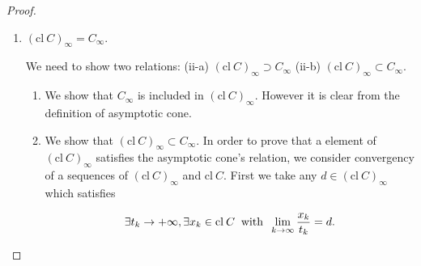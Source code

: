\documentclass[a4paper,11pt]{jsarticle}
\newcommand{\NaturalNumberSet}{\mathbb{N}}
\begin{document}
\begin{proof}
\begin{enumerate}[label=\roman*,align=CenterWithParen]
\begin{enumerate}[label=i-\alph*,align=CenterWithParen]
        By the definition of convergence of a sequence,

        \begin{equation}
          \begin{split}
            \forall \epsilon &> 0, \exists \bar{m} \in \NaturalNumberSet \:s.t.\: \forall m \geq \bar{m}, ||d_m -d|| < \frac{\epsilon}{2}, \text{and} \\
            \forall \epsilon &> 0, \exists \hat{m} \in \NaturalNumberSet \:s.t.\: \forall m \geq \hat{m}, ||\frac{x_m}{t_m} -d_m|| < \frac{\epsilon}{2}. \notag
          \end{split}
        \end{equation}

        Also, we let $\tilde{m} \coloneqq \:\text{max}\:\{\bar{m},\hat{m}\} \in \NaturalNumberSet$. By using triangle inequality,

        \begin{equation}
            \forall \epsilon > 0, \exists \tilde{m} \in \NaturalNumberSet \:s.t.\: \forall m \geq \bar{m}, ||\frac{x_m}{t_m} -d|| < \epsilon.\notag
        \end{equation}

        ($\because ||\frac{x_m}{t_m} -d|| \leq ||\frac{x_m}{t_m} - d_m|| + ||d_m - d|| < \epsilon.\notag $.)

        Therefore $c_{\infty}$ is a closed set.
      \end{enumerate}
      Then (i)'s proof is completed.
    \item $(\text{cl}\:C)_{\infty} = C_{\infty}$.

    We need to show two relations: (ii-a) $(\text{cl}\:C)_{\infty} \supset C_{\infty}$ (ii-b) $(\text{cl}\:C)_{\infty} \subset C_{\infty}$.

      \begin{enumerate}[label=ii-\alph*,align=CenterWithParen2]
        \item We show that $C_{\infty}$ is included in $(\text{cl}\:C)_{\infty}$. However it is clear from the definition of asymptotic cone.

        \item We show that $(\text{cl}\:C)_{\infty} \subset C_{\infty}$. In order to prove that a element of $(\text{cl}\:C)_{\infty}$ satisfies the asymptotic cone's relation, we consider convergency of a sequences of $(\text{cl}\:C)_{\infty}$ and $\text{cl}\:C$. First we take any $d \in (\text{cl}\:C)_{\infty}$ which satisfies

        \begin{equation}
          \exists t_k \rightarrow + \infty , \exists x_k \in \text{cl}\:C \:\text{ with }\: \lim_{k \to \infty} \frac{x_k}{t_k} = d. \notag
        \end{equation}


\end{enumerate}
\end{enumerate}
\end{proof}
\end{document}
